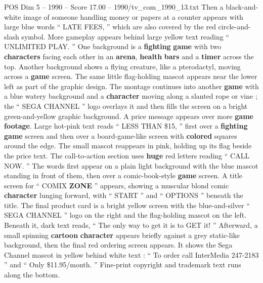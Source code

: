 \begin{textsample}{POS Dim 5 – 1990 – Score 17.00 – 1990/tv\_com\_1990\_13.txt}
Then a black-and-white image of someone handling money or papers at a counter appears with large blue words “ LATE FEES, ” which are also covered by the red circle-and-slash symbol.
More gameplay appears behind large yellow text reading “ UNLIMITED PLAY. ” One background is a \textbf{fighting} \textbf{game} with two \textbf{characters} facing each other in an \textbf{arena}, \textbf{health} \textbf{bars} and a \textbf{timer} across the top.
Another background shows a flying creature, like a pterodactyl, moving across a \textbf{game} screen.
The same little flag-holding mascot appears near the lower left as part of the graphic design.
The montage continues into another \textbf{game} with a blue watery background and a \textbf{character} moving along a slanted rope or vine ; the “ SEGA CHANNEL ” logo overlays it and then fills the screen on a bright green-and-yellow graphic background.
A price message appears over more \textbf{game} \textbf{footage}.
Large hot-pink text reads “ LESS THAN \$15, ” first over a \textbf{fighting} \textbf{game} screen and then over a board-game-like screen with \textbf{colored} squares around the edge.
The small mascot reappears in pink, holding up its flag beside the price text.
The call-to-action section uses \textbf{huge} red letters reading “ CALL NOW. ” The words first appear on a plain light background with the blue mascot standing in front of them, then over a comic-book-style \textbf{game} screen.
A title screen for “ COMIX \textbf{ZONE} ” appears, showing a muscular blond comic \textbf{character} lunging forward, with “ START ” and “ OPTIONS ” beneath the title.
The final product card is a bright yellow screen with the blue-and-silver “ SEGA CHANNEL ” logo on the right and the flag-holding mascot on the left.
Beneath it, dark text reads, “ The only way to get it is to GET it! ” Afterward, a small spinning \textbf{cartoon} \textbf{character} appears briefly against a grey static-like background, then the final red ordering screen appears.
It shows the Sega Channel mascot in yellow behind white text : “ To order call InterMedia 247-2183 ” and “ Only \$11.95/month. ” Fine-print copyright and trademark text runs along the bottom.

\end{textsample}
